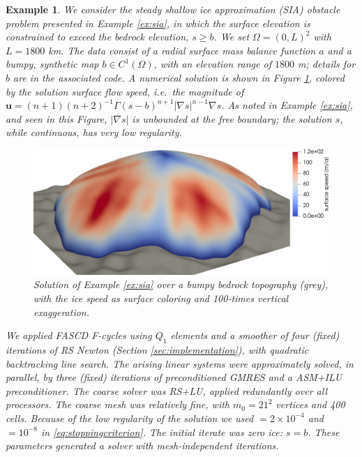 \documentclass[letterpaper,final,12pt,reqno]{amsart}
\theoremstyle{cstyle}
\theoremstyle{cstyle*}
\theoremstyle{dstyle}
\newtheorem{example}[theorem]{Example}
\numberwithin{equation}{section}
\numberwithin{figure}{section}
\numberwithin{table}{section}
\numberwithin{theorem}{section}
\newcommand{\grad}{\nabla}
\begin{document}
\begin{example}   \label{ex:results:sia}
We consider the steady shallow ice approximation (SIA) obstacle problem presented in Example \ref{ex:sia}, in which the surface elevation is constrained to exceed the bedrock elevation, $s\ge b$.  We set $\Omega=(0,L)^2$ with $L=1800$ km.  The data consist of a radial surface mass balance function $a$ \cite[equation (5.122)]{GreveBlatter2009} and a bumpy, synthetic map $b\in C^1(\Omega)$, with an elevation range of $1800$ m; details for $b$ are in the associated code.  A numerical solution is shown in Figure \ref{fig:results:siascene}, colored by the solution surface flow speed, i.e.~the magnitude of $\mathbf{u} = (n+1)(n+2)^{-1} \Gamma (s-b)^{n+1} |\grad s|^{n-1} \grad s$.  As noted in Example \ref{ex:sia}, and seen in this Figure, $|\grad s|$ is unbounded at the free boundary; the solution $s$, while continuous, has very low regularity.

\begin{figure}[ht]
\begin{center}
\includegraphics[width=1.0\textwidth]{fixfigs/sialev8scene.png}
\end{center}
\caption{Solution of Example \ref{ex:sia} over a bumpy bedrock topography (grey), with the ice speed as surface coloring and 100-times vertical exaggeration.}
\label{fig:results:siascene}
\end{figure}

We applied FASCD F-cycles using $Q_1$ elements and a smoother of four (fixed) iterations of RS Newton (Section \ref{sec:implementation}), with quadratic backtracking line search.  The arising linear systems were approximately solved, in parallel, by three (fixed) iterations of preconditioned GMRES and a ASM+ILU preconditioner.  The coarse solver was RS+LU, applied redundantly over all processors.  The coarse mesh was relatively fine, with $m_0=21^2$ vertices and 400 cells.  Because of the low regularity of the solution we used  $= 2 \times 10^{-4}$ and  $= 10^{-8}$ in \eqref{eq:stoppingcriterion}.  The initial iterate was zero ice: $s=b$.  These parameters generated a solver with mesh-independent iterations.


\end{example}
\end{document}
